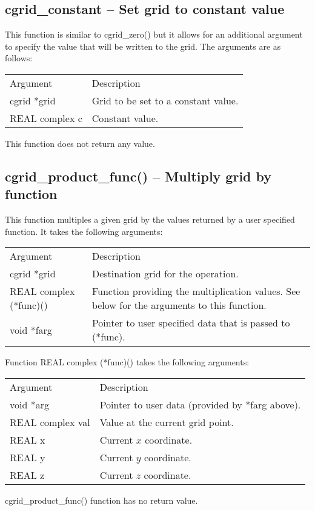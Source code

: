 \documentclass[12pt,letterpaper]{report}
\begin{document}
\subsection{cgrid\_constant -- Set grid to constant value}

This function is similar to cgrid\_zero() but it allows for an additional argument to specify the value that will be written to the grid. The arguments are as follows:
\begin{longtable}{p{} p{}}
Argument & Description\\
\cline{1-2}
cgrid *grid & Grid to be set to a constant value.\\
REAL complex c & Constant value.\\
\end{longtable}
\noindent
This function does not return any value.

\subsection{cgrid\_product\_func() -- Multiply grid by function}

This function multiples a given grid by the values returned by a user specified function. It takes the following arguments:
\begin{longtable}{p{} p{}}
Argument & Description\\
\cline{1-2}
cgrid *grid & Destination grid for the operation.\\
REAL complex (*func)() & Function providing the multiplication values. See below for the arguments to this function.\\
void *farg & Pointer to user specified data that is passed to (*func).\\   
\end{longtable}
\noindent
Function REAL complex (*func)() takes the following arguments:
\begin{longtable}{p{} p{}}
Argument & Description\\
\cline{1-2}
void *arg & Pointer to user data (provided by *farg above).\\
REAL complex val & Value at the current grid point.\\
REAL x & Current $x$ coordinate.\\
REAL y & Current $y$ coordinate.\\
REAL z & Current $z$ coordinate.\\
\end{longtable}
\noindent
cgrid\_product\_func() function has no return value.
\end{document}
